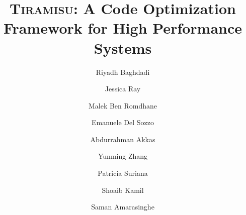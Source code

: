 \documentclass[sigplan,review,anonymous]{acmart}\settopmatter{printfolios=true,printccs=false,printacmref=false}
\newcommand\framework{\textsc{Tiramisu}\xspace}
\begin{document}
\title{\framework{}: A Code Optimization Framework for High Performance Systems}




\author{Riyadh Baghdadi}

\author{Jessica Ray}

\author{Malek Ben Romdhane}

\author{Emanuele Del Sozzo}

\author{Abdurrahman Akkas}

\author{Yunming Zhang}

\author{Patricia Suriana}

\author{Shoaib Kamil}

\author{Saman Amarasinghe}
\end{document}
